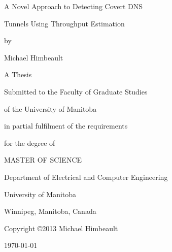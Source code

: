 \documentclass[12pt]{report}
\theoremstyle{remark}
\theoremstyle{definition}
\theoremstyle{definition}
\theoremstyle{definition}
\begin{document}

%

\pagestyle{empty}

\begin{titlepage}
\centerline{\huge{A Novel Approach to Detecting Covert DNS}}
\vspace{10mm}
\centerline{\huge{Tunnels Using Throughput Estimation}}
\vspace{20mm}
\centerline{by}
\vspace{5mm}
\centerline{\large{Michael Himbeault}}
\vspace{20mm}
\centerline{\large{A Thesis}}
\vspace{3mm}
\centerline{\large{Submitted to the Faculty of Graduate Studies}}
\vspace{3mm}
\centerline{\large{of the University of Manitoba}}
\vspace{3mm}
\centerline{\large{in partial fulfilment of the requirements}}
\vspace{3mm}
\centerline{\large{for the degree of}}
\vspace{13mm}
\centerline{\LARGE{MASTER OF SCIENCE}}
\vspace{15mm}
\centerline{\large{Department of Electrical and Computer Engineering}}
\centerline{\large{University of Manitoba}}
\centerline{\large{Winnipeg, Manitoba, Canada}}
\vspace{30mm}
\centerline{\large{Copyright \copyright 2013 Michael Himbeault}}
\centerline{}
\vfill
\centerline{\today}
\end{titlepage}
\end{document}
